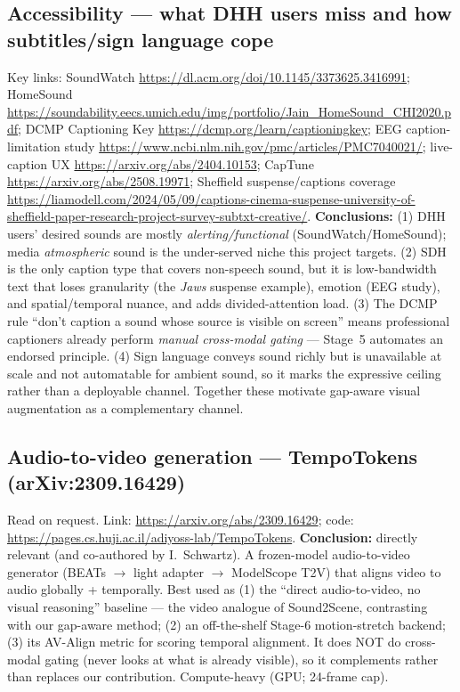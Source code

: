 \documentclass[11pt,a4paper]{article}
\begin{document}
\subsection*{Accessibility --- what DHH users miss and how subtitles/sign language cope}
Key links: SoundWatch \url{https://dl.acm.org/doi/10.1145/3373625.3416991}; HomeSound
\url{https://soundability.eecs.umich.edu/img/portfolio/Jain_HomeSound_CHI2020.pdf}; DCMP Captioning
Key \url{https://dcmp.org/learn/captioningkey}; EEG caption-limitation study
\url{https://www.ncbi.nlm.nih.gov/pmc/articles/PMC7040021/}; live-caption UX
\url{https://arxiv.org/abs/2404.10153}; CapTune \url{https://arxiv.org/abs/2508.19971}; Sheffield
suspense/captions coverage
\url{https://liamodell.com/2024/05/09/captions-cinema-suspense-university-of-sheffield-paper-research-project-survey-subtxt-creative/}.
\textbf{Conclusions:} (1) DHH users' desired sounds are mostly \emph{alerting/functional}
(SoundWatch/HomeSound); media \emph{atmospheric} sound is the under-served niche this project targets.
(2) SDH is the only caption type that covers non-speech sound, but it is low-bandwidth text that loses
granularity (the \emph{Jaws} suspense example), emotion (EEG study), and spatial/temporal nuance, and
adds divided-attention load. (3) The DCMP rule ``don't caption a sound whose source is visible on
screen'' means professional captioners already perform \emph{manual cross-modal gating} --- Stage~5
automates an endorsed principle. (4) Sign language conveys sound richly but is unavailable at scale
and not automatable for ambient sound, so it marks the expressive ceiling rather than a deployable
channel. Together these motivate gap-aware visual augmentation as a complementary channel.

\subsection*{Audio-to-video generation --- TempoTokens (arXiv:2309.16429)}
Read on request. Link: \url{https://arxiv.org/abs/2309.16429}; code:
\url{https://pages.cs.huji.ac.il/adiyoss-lab/TempoTokens}.
\textbf{Conclusion:} directly relevant (and co-authored by I.\ Schwartz). A frozen-model audio-to-video
generator (BEATs $\rightarrow$ light adapter $\rightarrow$ ModelScope T2V) that aligns video to audio
globally + temporally. Best used as (1) the ``direct audio-to-video, no visual reasoning'' baseline
--- the video analogue of Sound2Scene, contrasting with our gap-aware method; (2) an off-the-shelf
Stage-6 motion-stretch backend; (3) its AV-Align metric for scoring temporal alignment. It does NOT
do cross-modal gating (never looks at what is already visible), so it complements rather than replaces
our contribution. Compute-heavy (GPU; 24-frame cap).
\end{document}
